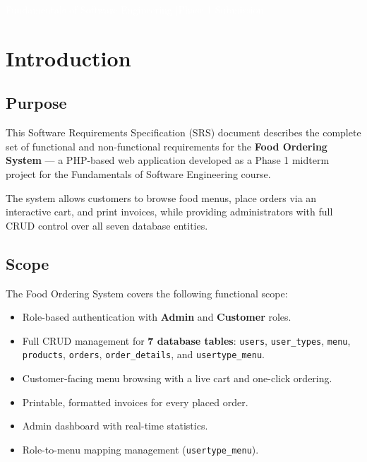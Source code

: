\documentclass[12pt,a4paper]{article}
\newcommand{\code}[1]{\texttt{\footnotesize\colorbox{codebg}{#1}}}
\begin{document}
\vfill
\begin{center}
  \textcolor{white}{\small Fundamentals of Software Engineering \quad|\quad Phase 1 Submission}
\end{center}
\vspace{0.6cm}

\newpage
{}

\tableofcontents
\newpage
{}

\section{Introduction}

\subsection{Purpose}

This Software Requirements Specification (SRS) document describes the complete set of
functional and non-functional requirements for the \textbf{Food Ordering System} --- a
PHP-based web application developed as a Phase 1 midterm project for the Fundamentals
of Software Engineering course.

The system allows customers to browse food menus, place orders via an interactive cart,
and print invoices, while providing administrators with full CRUD control over all
seven database entities.

\subsection{Scope}

The Food Ordering System covers the following functional scope:

\begin{itemize}[leftmargin=1.5em, itemsep=3pt]
  \item Role-based authentication with \textbf{Admin} and \textbf{Customer} roles.
  \item Full CRUD management for \textbf{7 database tables}: \code{users},
        \code{user\_types}, \code{menu}, \code{products}, \code{orders},
        \code{order\_details}, and \code{usertype\_menu}.
  \item Customer-facing menu browsing with a live cart and one-click ordering.
  \item Printable, formatted invoices for every placed order.
  \item Admin dashboard with real-time statistics.
  \item Role-to-menu mapping management (\code{usertype\_menu}).
\end{itemize}
\end{document}
